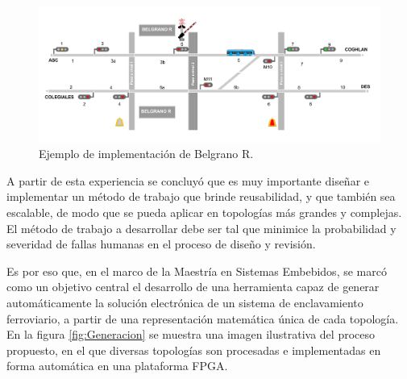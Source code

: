 		\begin{figure}[htbp!]
			\centering
			\includegraphics[scale=.27]{./Figures/Belgrano_R}
			\caption{Ejemplo de implementación de Belgrano R.}
			\label{fig:CESE_1}
		\end{figure}	
		
		
		A partir de esta experiencia se concluyó que es muy importante diseñar e implementar un método de trabajo que brinde reusabilidad, y que también sea escalable, de modo que se pueda aplicar en topologías más grandes y complejas. El método de trabajo a desarrollar debe ser tal que minimice la probabilidad y severidad de fallas humanas en el proceso de diseño y revisión.
				
		
		
		Es por eso que, en el marco de la Maestría en Sistemas Embebidos, se marcó como un objetivo central el desarrollo de una herramienta capaz de generar automáticamente la solución electrónica de un sistema de enclavamiento ferroviario, a partir de una representación matemática única de cada topología. En la figura \ref{fig:Generacion} se muestra una imagen ilustrativa del proceso propuesto, en el que diversas topologías son procesadas e implementadas en forma automática en una plataforma FPGA.
				
